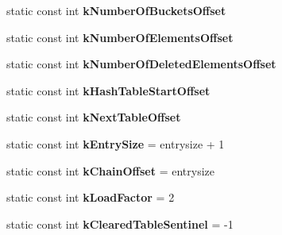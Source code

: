 \begin{DoxyCompactItemize}
\item 
static const int {\bfseries k\+Number\+Of\+Buckets\+Offset}
\item 
static const int {\bfseries k\+Number\+Of\+Elements\+Offset}
\item 
static const int {\bfseries k\+Number\+Of\+Deleted\+Elements\+Offset}
\item 
static const int {\bfseries k\+Hash\+Table\+Start\+Offset}
\item 
static const int {\bfseries k\+Next\+Table\+Offset}
\item 
static const int {\bfseries k\+Entry\+Size} = entrysize + 1\hypertarget{classv8_1_1internal_1_1_ordered_hash_table_acae2de35d63f1765e78195ecadc6528e}{}\label{classv8_1_1internal_1_1_ordered_hash_table_acae2de35d63f1765e78195ecadc6528e}

\item 
static const int {\bfseries k\+Chain\+Offset} = entrysize\hypertarget{classv8_1_1internal_1_1_ordered_hash_table_a6ca68c36dccba770c22db62bd70d0786}{}\label{classv8_1_1internal_1_1_ordered_hash_table_a6ca68c36dccba770c22db62bd70d0786}

\item 
static const int {\bfseries k\+Load\+Factor} = 2\hypertarget{classv8_1_1internal_1_1_ordered_hash_table_a80091c2d14a53d3aff0e91c13ea64ba3}{}\label{classv8_1_1internal_1_1_ordered_hash_table_a80091c2d14a53d3aff0e91c13ea64ba3}

\item 
static const int {\bfseries k\+Cleared\+Table\+Sentinel} = -\/1\hypertarget{classv8_1_1internal_1_1_ordered_hash_table_a19544368d68ad667224afd52cf9f957b}{}\label{classv8_1_1internal_1_1_ordered_hash_table_a19544368d68ad667224afd52cf9f957b}

\end{DoxyCompactItemize}
